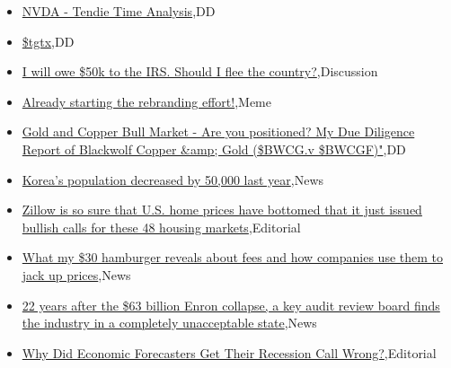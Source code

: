 \documentclass{article}%
\begin{document}
%
\begin{itemize}%
\item%
\href{https://reddit.com/r/wallstreetbets/comments/15cqp81/nvda\_tendie\_time\_analysis/}{ NVDA - Tendie Time Analysis},DD%
\item%
\href{https://reddit.com/r/wallstreetbets/comments/15cqihb/tgtx/}{\$tgtx},DD%
\item%
\href{https://reddit.com/r/wallstreetbets/comments/15cpkfh/i\_will\_owe\_50k\_to\_the\_irs\_should\_i\_flee\_the/}{I will owe \$50k to the IRS. Should I flee the country?},Discussion%
\item%
\href{https://reddit.com/r/wallstreetbets/comments/15ciipk/already\_starting\_the\_rebranding\_effort/}{Already starting the rebranding effort!},Meme%
\item%
\href{https://reddit.com/r/Baystreetbets/comments/15c8njc/gold\_and\_copper\_bull\_market\_are\_you\_positioned\_my/}{Gold and Copper Bull Market - Are you positioned? My Due Diligence Report of Blackwolf Copper \&amp; Gold (\$BWCG.v \$BWCGF)"},DD%
\item%
\href{https://reddit.com/r/Economics/comments/15cdm8n/koreas\_population\_decreased\_by\_50000\_last\_year/}{Korea's population decreased by 50,000 last year},News%
\item%
\href{https://reddit.com/r/Economics/comments/15cd9ia/zillow\_is\_so\_sure\_that\_us\_home\_prices\_have/}{Zillow is so sure that U.S. home prices have bottomed that it just issued bullish calls for these 48 housing markets},Editorial%
\item%
\href{https://reddit.com/r/Economics/comments/15c9pko/what\_my\_30\_hamburger\_reveals\_about\_fees\_and\_how/}{What my \$30 hamburger reveals about fees and how companies use them to jack up prices},News%
\item%
\href{https://reddit.com/r/Economics/comments/15c8f2k/22\_years\_after\_the\_63\_billion\_enron\_collapse\_a/}{22 years after the \$63 billion Enron collapse, a key audit review board finds the industry in a completely unacceptable state},News%
\item%
\href{https://reddit.com/r/Economics/comments/15c6kog/why\_did\_economic\_forecasters\_get\_their\_recession/}{Why Did Economic Forecasters Get Their Recession Call Wrong?},Editorial%
\end{itemize}%
\end{document}
